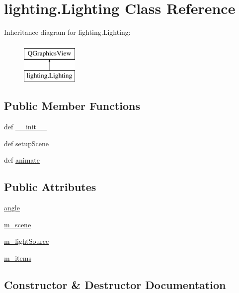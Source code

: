 \hypertarget{classlighting_1_1Lighting}{}\section{lighting.\+Lighting Class Reference}
\label{classlighting_1_1Lighting}
Inheritance diagram for lighting.\+Lighting\+:\begin{figure}[H]
\begin{center}
\leavevmode
\includegraphics[height=2.000000cm]{classlighting_1_1Lighting}
\end{center}
\end{figure}
\subsection*{Public Member Functions}
\begin{DoxyCompactItemize}
\item 
def \hyperlink{classlighting_1_1Lighting_ae5835e51243b2fb9a45eab6359709631}{\+\_\+\+\_\+init\+\_\+\+\_\+}
\item 
def \hyperlink{classlighting_1_1Lighting_a31d0b9924a02b7bfa453400087bf7fe6}{setup\+Scene}
\item 
def \hyperlink{classlighting_1_1Lighting_a583d78b3b82a39e8dca34e7a1ffae71e}{animate}
\end{DoxyCompactItemize}
\subsection*{Public Attributes}
\begin{DoxyCompactItemize}
\item 
\hyperlink{classlighting_1_1Lighting_a4930dbfa36dc2538ff896113c9c7c56b}{angle}
\item 
\hyperlink{classlighting_1_1Lighting_a2193b8f1cf5097a64436d21d5685ba55}{m\+\_\+scene}
\item 
\hyperlink{classlighting_1_1Lighting_af01e8b0df11f45e75cfe9cf97de1e1d0}{m\+\_\+light\+Source}
\item 
\hyperlink{classlighting_1_1Lighting_abd8e9c2722836e401579fd80f038bbec}{m\+\_\+items}
\end{DoxyCompactItemize}


\subsection{Constructor \& Destructor Documentation}
\hypertarget{classlighting_1_1Lighting_ae5835e51243b2fb9a45eab6359709631}{}
